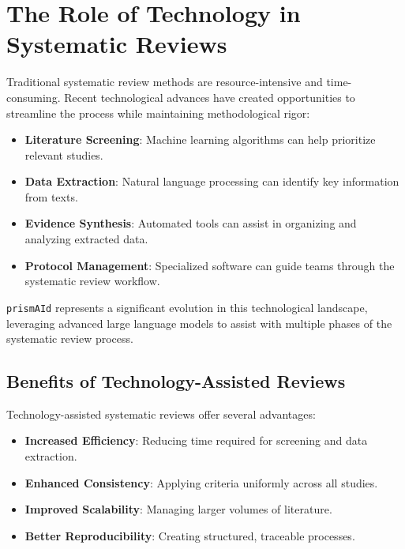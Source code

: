 
\section{The Role of Technology in Systematic Reviews}

Traditional systematic review methods are resource-intensive and time-consuming. Recent technological advances have created opportunities to streamline the process while maintaining methodological rigor:

\begin{itemize}
    \item \textbf{Literature Screening}: Machine learning algorithms can help prioritize relevant studies.
    \item \textbf{Data Extraction}: Natural language processing can identify key information from texts.
    \item \textbf{Evidence Synthesis}: Automated tools can assist in organizing and analyzing extracted data.
    \item \textbf{Protocol Management}: Specialized software can guide teams through the systematic review workflow.
\end{itemize}

\texttt{prismAId} represents a significant evolution in this technological landscape, leveraging advanced large language models to assist with multiple phases of the systematic review process.

\subsection{Benefits of Technology-Assisted Reviews}

Technology-assisted systematic reviews offer several advantages:

\begin{itemize}
    \item \textbf{Increased Efficiency}: Reducing time required for screening and data extraction.
    \item \textbf{Enhanced Consistency}: Applying criteria uniformly across all studies.
    \item \textbf{Improved Scalability}: Managing larger volumes of literature.
    \item \textbf{Better Reproducibility}: Creating structured, traceable processes.
\end{itemize}

